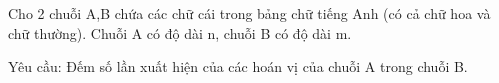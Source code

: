 Cho 2 chuỗi A,B chứa các chữ cái trong bảng chữ tiếng Anh (có cả chữ hoa và chữ thường). Chuỗi A có độ dài n, chuỗi B có độ dài m.  

       Yêu cầu:      Đếm số lần xuất hiện của các hoán vị của chuỗi A trong chuỗi B.